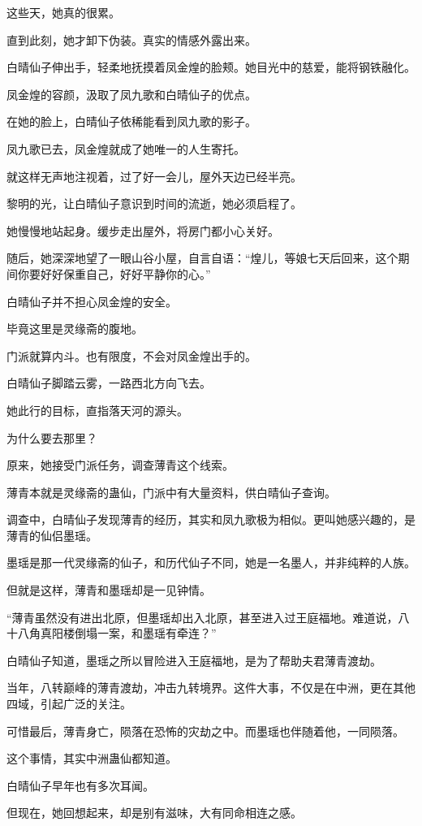 \begin{this_body}
这些天，她真的很累。

直到此刻，她才卸下伪装。真实的情感外露出来。

白晴仙子伸出手，轻柔地抚摸着凤金煌的脸颊。她目光中的慈爱，能将钢铁融化。

凤金煌的容颜，汲取了凤九歌和白晴仙子的优点。

在她的脸上，白晴仙子依稀能看到凤九歌的影子。

凤九歌已去，凤金煌就成了她唯一的人生寄托。

就这样无声地注视着，过了好一会儿，屋外天边已经半亮。

黎明的光，让白晴仙子意识到时间的流逝，她必须启程了。

她慢慢地站起身。缓步走出屋外，将房门都小心关好。

随后，她深深地望了一眼山谷小屋，自言自语：“煌儿，等娘七天后回来，这个期间你要好好保重自己，好好平静你的心。”

白晴仙子并不担心凤金煌的安全。

毕竟这里是灵缘斋的腹地。

门派就算内斗。也有限度，不会对凤金煌出手的。

白晴仙子脚踏云雾，一路西北方向飞去。

她此行的目标，直指落天河的源头。

为什么要去那里？

原来，她接受门派任务，调查薄青这个线索。

薄青本就是灵缘斋的蛊仙，门派中有大量资料，供白晴仙子查询。

调查中，白晴仙子发现薄青的经历，其实和凤九歌极为相似。更叫她感兴趣的，是薄青的仙侣墨瑶。

墨瑶是那一代灵缘斋的仙子，和历代仙子不同，她是一名墨人，并非纯粹的人族。

但就是这样，薄青和墨瑶却是一见钟情。

“薄青虽然没有进出北原，但墨瑶却出入北原，甚至进入过王庭福地。难道说，八十八角真阳楼倒塌一案，和墨瑶有牵连？”

白晴仙子知道，墨瑶之所以冒险进入王庭福地，是为了帮助夫君薄青渡劫。

当年，八转巅峰的薄青渡劫，冲击九转境界。这件大事，不仅是在中洲，更在其他四域，引起广泛的关注。

可惜最后，薄青身亡，陨落在恐怖的灾劫之中。而墨瑶也伴随着他，一同陨落。

这个事情，其实中洲蛊仙都知道。

白晴仙子早年也有多次耳闻。

但现在，她回想起来，却是别有滋味，大有同命相连之感。


\end{this_body}
